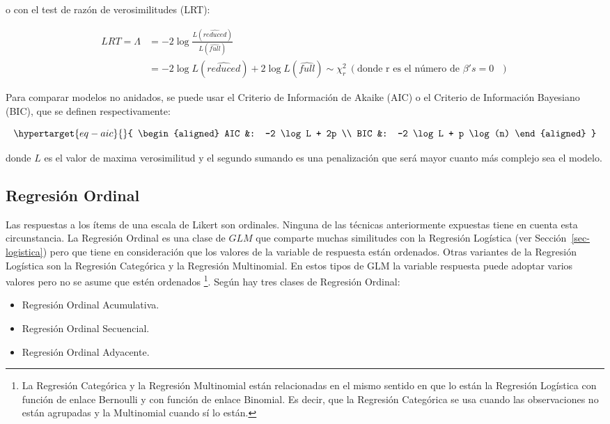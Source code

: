 \documentclass[
  12pt,
  a4paper,
  extrafontsizes,
  onecolumn,
  openright,
  table]{memoir}
\providecommand{\tightlist}{%
  \setlength{\itemsep}{0pt}\setlength{\parskip}{0pt}}\usepackage{longtable,booktabs,array}
\begin{document}
o con el test de razón de verosimilitudes (LRT):

\[
\begin{aligned}
LRT = \Lambda &= -2 \log \frac{L(\widehat{reduced})}{L(\widehat{full})}\\
&= -2 \log L(\widehat{reduced}) + 2 \log L(\widehat{full}) \sim \chi^2_r\ (\text{donde r es el número de $\beta 's = 0$ })
\end{aligned}
\]

Para comparar modelos no anidados, se puede usar el Criterio de
Información de Akaike (AIC) o el Criterio de Información Bayesiano
(BIC), que se definen respectivamente:

\begin{equation}\protect\hypertarget{eq-aic}{}{
\begin{aligned}
AIC &: -2 \log L + 2p \\
BIC &: -2 \log L + p \log(n)
\end{aligned}
}\label{eq-aic}\end{equation}

donde \(L\) es el valor de maxima verosimilitud y el segundo sumando es
una penalización que será mayor cuanto más complejo sea el modelo.

\hypertarget{sec-ordinal}{%
\subsection{Regresión Ordinal}\label{sec-ordinal}}

Las respuestas a los ítems de una escala de Likert son ordinales.
Ninguna de las técnicas anteriormente expuestas tiene en cuenta esta
circunstancia. La Regresión Ordinal es una clase de \(GLM\) que comparte
muchas similitudes con la Regresión Logística (ver
Sección~\ref{sec-logistica}) pero que tiene en consideración que los
valores de la variable de respuesta están ordenados. Otras variantes de
la Regresión Logística son la Regresión Categórica y la Regresión
Multinomial. En estos tipos de GLM la variable respuesta puede adoptar
varios valores pero no se asume que estén ordenados \footnote{La
  Regresión Categórica y la Regresión Multinomial están relacionadas en
  el mismo sentido en que lo están la Regresión Logística con función de
  enlace Bernoulli y con función de enlace Binomial. Es decir, que la
  Regresión Categórica se usa cuando las observaciones no están
  agrupadas y la Multinomial cuando sí lo están.}. Según
\textcite{burkner2019} hay tres clases de Regresión Ordinal:

\begin{itemize}
\tightlist
\item
  Regresión Ordinal Acumulativa.
\item
  Regresión Ordinal Secuencial.
\item
  Regresión Ordinal Adyacente.
\end{itemize}
\end{document}

